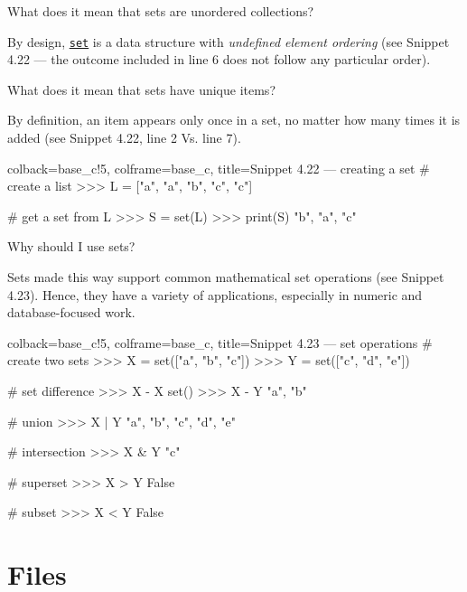 \documentclass[a4paper,11pt]{book}
\newcommand{\question}[1]{%
    \begin{tcolorbox}[colback=comp_c!10,colframe=comp_c,sidebyside align=top,width=\linewidth,before skip=1ex]
        #1
    \end{tcolorbox}
    \switchcolumn%
}
\newcommand{\note}[1]{%
    \begin{tcolorbox}[colback=white!0,colframe=white!10,width=\linewidth,before skip=1ex]
        #1
    \end{tcolorbox}
}
\begin{document}
\begin{paracol}{2}
	\question{\raggedright What does it mean that sets are unordered collections?}
	\note{By design, \href{https://docs.python.org/3/tutorial/datastructures.html\#sets}{\texttt{set}} is a data structure with \emph{undefined element ordering} (see Snippet 4.22 --- the outcome included in line 6 does not follow any particular order).}
\end{paracol}

\begin{paracol}{2}
	\question{\raggedright What does it mean that sets have unique items?}
	\note{By definition, an item appears only once in a set, no matter how many times it is added (see Snippet 4.22, line 2 Vs. line 7).}
\end{paracol}

\clearpage

\begin{pythoncode}[linenos=true,]{colback=base_c!5, colframe=base_c, title=\sffamily Snippet 4.22 --- creating a set}
# create a list
>>> L = ["a", "a", "b", "c", "c"]

# get a set from L
>>> S = set(L)
>>> print(S)
{"b", "a", "c"}
\end{pythoncode}

\begin{paracol}{2}
	\question{\raggedright Why should I use sets?}
	\note{Sets made this way support common mathematical set operations (see Snippet 4.23). Hence, they have a variety of applications, especially in numeric and database-focused work. }
\end{paracol}

\begin{pythoncode}[linenos=true,]{colback=base_c!5, colframe=base_c, title=\sffamily Snippet 4.23 --- set operations}
# create two sets 
>>> X = set(["a", "b", "c"])
>>> Y = set(["c", "d", "e"])

# set difference 
>>> X - X
set()
>>> X - Y
{"a", "b"}

# union
>>> X | Y
{"a", "b", "c", "d", "e"}

# intersection
>>> X & Y
{"c"}

# superset
>>> X > Y
False

# subset
>>> X < Y
False
\end{pythoncode}
\clearpage

\section{Files}
\end{document}
